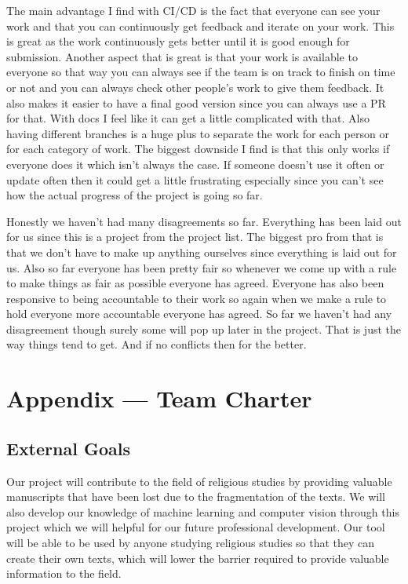 \documentclass{article}
\begin{document}
\hspace{2em} The main advantage I find with CI/CD is the fact that everyone can see your work and that you can continuously get feedback and iterate on your work. This is great as the work continuously gets better until it is good enough for submission. Another aspect that is great is that your work is available to everyone so that way you can always see if the team is on track to finish on time or not and you can always check other people’s work to give them feedback. It also makes it easier to have a final good version since you can always use a PR for that. With docs I feel like it can get a little complicated with that. Also having different branches is a huge plus to separate the work for each person or for each category of work. The biggest downside I find is that this only works if everyone does it which isn’t always the case. If someone doesn’t use it often or update often then it could get a little frustrating especially since you can’t see how the actual progress of the project is going so far.

\hspace{2em} Honestly we haven’t had many disagreements so far. Everything has been laid out for us since this is a project from the project list. The biggest pro from that is that we don’t have to make up anything ourselves since everything is laid out for us. Also so far everyone has been pretty fair so whenever we come up with a rule to make things as fair as possible everyone has agreed. Everyone has also been responsive to being accountable to their work so again when we make a rule to hold everyone more accountable everyone has agreed. So far we haven’t had any disagreement though surely some will pop up later in the project. That is just the way things tend to get. And if no conflicts then for the better.


\newpage{}

\section*{Appendix --- Team Charter}


\subsection*{External Goals}

Our project will contribute to the field of religious studies by providing valuable manuscripts that have been lost due to the fragmentation of the texts. We will also develop our knowledge 
of machine learning and computer vision through this project which we will helpful for our future professional development. Our tool will be able to be used by anyone studying 
religious studies so that they can create their own texts, which will lower the barrier required to provide valuable information to the field.
\end{document}
